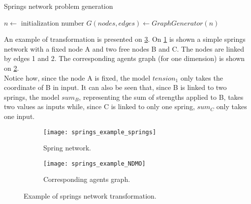 \begin{algorithm}
\caption{Springs network problem generation}
\label{algo_springs}
	$n \leftarrow$ initialization number\;
	$G(nodes, edges) \leftarrow GraphGenerator(n)$\;
	
			
\end{algorithm}

An example of transformation is presented on \figurename{} \ref{springs_example}. On \figurename{} \ref{springs_example:springs} is shown a simple springs network with a fixed node A and two free nodes B and C. The nodes are linked by edges 1 and 2. The corresponding agents graph (for one dimension) is shown on \figurename{} \ref{springs_example:agents}.\\
Notice how, since the node A is fixed, the model $tension_1$ only takes the coordinate of B in input. It can also be seen that, since B is linked to two springs, the model $sum_B$, representing the sum of strengths applied to B, takes two values as inputs while, since C is linked to only one spring, $sum_C$ only takes one input.

\begin{figure}
\centering
\begin{subfigure}[b]{0.3\textwidth}
\texttt{[image: springs\_example\_springs]}
\caption{Spring network.}\label{springs_example:springs}
\end{subfigure}
\qquad
\begin{subfigure}[b]{0.35\textwidth}
\texttt{[image: springs\_example\_NDMO]}
\caption{Corresponding agents graph.}\label{springs_example:agents}
\end{subfigure}

\caption{Example of springs network transformation.}\label{springs_example}
\end{figure}


